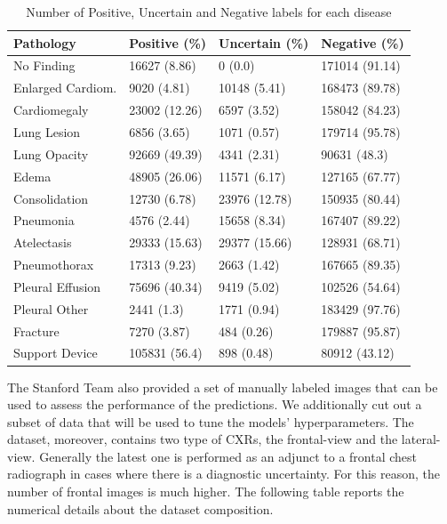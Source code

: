 \begin{table}[h!]
\centering
\begin{tabular}{|l|l|l|l|} 
\hline
\textbf{Pathology}         &  \hfill \textbf{Positive (\%)}& \hfill \textbf{Uncertain (\%)}  & \hfill \textbf{Negative (\%)}   \\ 
\hline
No Finding        &    \hfill16627 (8.86)&      \hfill   0 (0.0)  & \hfill171014 (91.14)    \\\hline
Enlarged Cardiom. &    \hfill 9020 (4.81)&   \hfill 10148 (5.41)  & \hfill168473 (89.78)    \\\hline
Cardiomegaly      &  \hfill 23002 (12.26)&    \hfill 6597 (3.52)  & \hfill158042 (84.23)    \\\hline
Lung Lesion       &   \hfill  6856 (3.65)&   \hfill  1071 (0.57)  & \hfill179714 (95.78)    \\\hline
Lung Opacity      &  \hfill 92669 (49.39)&   \hfill  4341 (2.31)  & \hfill90631 (48.3)  \\\hline
Edema             &  \hfill 48905 (26.06)&   \hfill 11571 (6.17)  & \hfill127165 (67.77)    \\\hline
Consolidation     &  \hfill  12730 (6.78)&   \hfill23976 (12.78)  & \hfill150935 (80.44)    \\\hline
Pneumonia         &  \hfill   4576 (2.44)&   \hfill 15658 (8.34)  & \hfill167407 (89.22)    \\\hline
Atelectasis       & \hfill  29333 (15.63)&  \hfill 29377 (15.66)  & \hfill128931 (68.71)    \\\hline
Pneumothorax      & \hfill   17313 (9.23)&   \hfill  2663 (1.42)  & \hfill167665 (89.35)    \\\hline
Pleural Effusion  &  \hfill 75696 (40.34)&   \hfill  9419 (5.02)  & \hfill102526 (54.64)    \\\hline
Pleural Other     &  \hfill    2441 (1.3)&   \hfill  1771 (0.94)  & \hfill183429 (97.76)    \\\hline
Fracture          &  \hfill   7270 (3.87)&   \hfill   484 (0.26)  & \hfill179887 (95.87)    \\\hline
Support Device    &  \hfill 105831 (56.4)&   \hfill   898 (0.48)  &  \hfill80912 (43.12)   \\
\hline
\end{tabular}
\caption{Number of Positive, Uncertain and Negative labels for each disease}
\label{table:table_2}
\end{table}

The Stanford Team also provided a set of manually labeled images that can be used to assess the performance of the predictions. We additionally cut out a subset of data that will be used to tune the models' hyperparameters.
The dataset, moreover, contains two type of \acp{CXR}, the frontal-view and the lateral-view. Generally the latest one is performed as an adjunct to a frontal chest radiograph in cases where there is a diagnostic uncertainty. For this reason, the number of frontal images is much higher. The following table reports the numerical details about the dataset composition.

